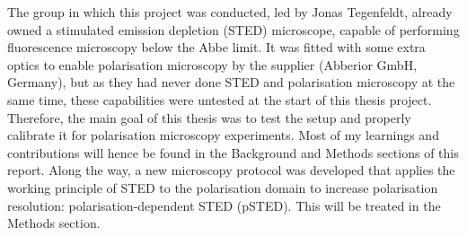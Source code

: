 The group in which this project was conducted, led by Jonas Tegenfeldt, already owned a stimulated emission depletion (STED) microscope, capable of performing fluorescence microscopy below the Abbe limit. It was fitted with some extra optics to enable polarisation microscopy by the supplier (Abberior GmbH, Germany), but as they had never done STED and polarisation microscopy at the same time, these capabilities were untested at the start of this thesis project. Therefore, the main goal of this thesis was to test the setup and properly calibrate it for polarisation microscopy experiments. Most of my learnings and contributions will hence be found in the Background and Methods sections of this report.
Along the way, a new microscopy protocol was developed that applies the working principle of STED to the polarisation domain to increase polarisation resolution: polarisation-dependent STED (pSTED). This will be treated in the Methods section.

